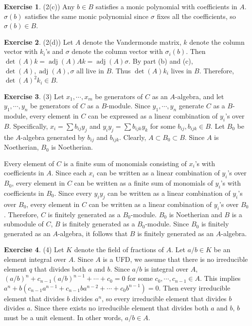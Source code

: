\documentclass[12pt, psamsfonts]{amsart}
\theoremstyle{definition}
\newtheorem*{exer}{Exercise}
\theoremstyle{remark}
\DeclareMathOperator{\adj}{adj}
\numberwithin{equation}{section}
\begin{document}
\begin{exer}{(2(c))}
  Any $b \in B$ satisfies a monic polynomial with coefficients in $A$.
  $\sigma(b)$ satisfies the same monic polynomial since $\sigma$ fixes all the coefficients, so $\sigma(b) \in B$.
\end{exer}

\begin{exer}{(2(d))}
  Let $A$ denote the Vandermonde matrix, $k$ denote the column vector with $k_i$'s and $\sigma$ denote the column vector with $\sigma_i(b)$.
  Then $\det(A)k = \adj(A)Ak = \adj(A)\sigma$.
  By part (b) and (c), $\det(A), \adj(A), \sigma$ all live in $B$.
  Thus $\det(A)k_i$ lives in $B$.
  Therefore, $\det(A)^2k_i \in B$.
\end{exer}

\begin{exer}{(3)}
  Let $x_1, \cdots, x_m$ be generators of $C$ as an $A$-algebra, and let $y_1, \cdots, y_n$ be generators of $C$ as a $B$-module.
  Since $y_1, \cdots, y_n$ generate $C$ as a $B$-module, every element in $C$ can be expressed as a linear combination of $y_i$'s over $B$.
  Specifically, $x_i = \sum b_{ij} y_j$ and $y_iy_j = \sum b_{ijk}y_k$ for some $b_{ij}, b_{ijk} \in B$.
  Let $B_0$ be the $A$-algebra generated by $b_{ij}$ and $b_{ijk}$.
  Clearly, $A \subset B_0 \subset B$.
  Since $A$ is Noetherian, $B_0$ is Noetherian.

  Every element of $C$ is a finite sum of monomials consisting of $x_i$'s with coefficients in $A$.
  Since each $x_i$ can be written as a linear combination of $y_i$'s over $B_0$, every element in $C$ can be written as a finite sum of monomials of $y_i$'s with coefficients in $B_0$.
  Since every $y_iy_j$ can be written as a linear combination of $y_i$'s over $B_0$, every element in $C$ can be written as a linear combination of $y_i$'s over $B_0$.
  Therefore, $C$ is finitely generated as a $B_0$-module.
  $B_0$ is Noetherian and $B$ is a submodule of $C$, $B$ is finitely generated as a $B_0$-module.
  Since $B_0$ is finitely generated as an $A$-algebra, it follows that $B$ is finitely generated as an $A$-algebra.
\end{exer}

\begin{exer}{(4)}
  Let $K$ denote the field of fractions of $A$.
  Let $a / b \in K$ be an element integral over $A$.
  Since $A$ is a UFD, we assume that there is no irreducible element $q$ that divides both $a$ and $b$.
  Since $a / b$ is integral over $A$, $(a / b)^n + c_{n - 1}(a / b)^{n - 1} + \cdots + c_0 = 0$ for some $c_0, \cdots, c_{n - 1} \in A$.
  This implies $a^n + b(c_{n - 1}a^{n - 1} + c_{n - 1}ba^{n - 2} + \cdots + c_0b^{n - 1}) = 0$.
  Then every irreducible element that divides $b$ divides $a^n$, so every irreducible element that divides $b$ divides $a$.
  Since there exists no irreducible element that divides both $a$ and $b$, $b$ must be a unit element.
  In other words, $a / b \in A$.
\end{exer}
\end{document}
